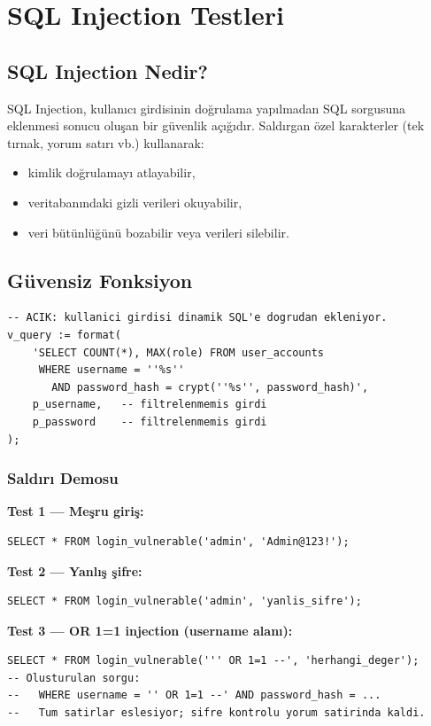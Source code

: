 \documentclass[12pt, a4paper]{report}
\begin{document}
\chapter{SQL Injection Testleri}

\section{SQL Injection Nedir?}

SQL Injection, kullanıcı girdisinin doğrulama yapılmadan SQL sorgusuna eklenmesi sonucu oluşan bir güvenlik açığıdır. Saldırgan özel karakterler (tek tırnak, yorum satırı vb.) kullanarak:
\begin{itemize}
  \item kimlik doğrulamayı atlayabilir,
  \item veritabanındaki gizli verileri okuyabilir,
  \item veri bütünlüğünü bozabilir veya verileri silebilir.
\end{itemize}

\section{Güvensiz Fonksiyon}

\begin{lstlisting}[caption={Güvensiz login fonksiyonu (login\_vulnerable)}]
-- ACIK: kullanici girdisi dinamik SQL'e dogrudan ekleniyor.
v_query := format(
    'SELECT COUNT(*), MAX(role) FROM user_accounts
     WHERE username = ''%s''
       AND password_hash = crypt(''%s'', password_hash)',
    p_username,   -- filtrelenmemis girdi
    p_password    -- filtrelenmemis girdi
);
\end{lstlisting}

\subsection{Saldırı Demosu}

\textbf{Test 1 — Meşru giriş:}
\begin{lstlisting}
SELECT * FROM login_vulnerable('admin', 'Admin@123!');
\end{lstlisting}

\textbf{Test 2 — Yanlış şifre:}
\begin{lstlisting}
SELECT * FROM login_vulnerable('admin', 'yanlis_sifre');
\end{lstlisting}

\textbf{Test 3 — OR 1=1 injection (username alanı):}
\begin{lstlisting}
SELECT * FROM login_vulnerable(''' OR 1=1 --', 'herhangi_deger');
-- Olusturulan sorgu:
--   WHERE username = '' OR 1=1 --' AND password_hash = ...
--   Tum satirlar eslesiyor; sifre kontrolu yorum satirinda kaldi.
\end{lstlisting}
\end{document}
